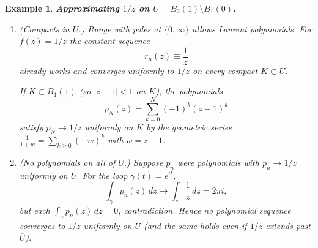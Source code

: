 \documentclass[11pt,a4paper]{article}
\newtheorem{example}{Example}
\theoremstyle{definition}
\theoremstyle{definition}
\theoremstyle{plain}
\theoremstyle{remark}
\begin{document}
\begin{example}
	\textbf{Approximating $1/z$ on $U=B_2(1)\setminus B_1(0)$.}
	\begin{enumerate}
		\item[(i)] (Compacts in $U$.) Runge with poles at $\{0,\infty\}$ allows Laurent polynomials.
		For $f(z)=1/z$ the constant sequence
		\[
		r_n(z)\equiv \frac{1}{z}
		\]
		already works and converges uniformly to $1/z$ on every compact $K\subset U$.
		
		If $K\subset B_1(1)$ (so $|z-1|<1$ on $K$), the \emph{polynomials}
		\[
		p_N(z)=\sum_{k=0}^N (-1)^k(z-1)^k
		\]
		satisfy $p_N\to 1/z$ uniformly on $K$ by the geometric series
		$\frac{1}{1+w}=\sum_{k\ge0}(-w)^k$ with $w=z-1$.
		
		\item[(ii)] (No polynomials on all of $U$.) Suppose $p_n$ were polynomials with
		$p_n\to 1/z$ uniformly on $U$. For the loop $\gamma(t)=e^{it}$,
		\[
		\int_\gamma p_n(z)\,dz \longrightarrow \int_\gamma \frac{1}{z}\,dz=2\pi i,
		\]
		but each $\int_\gamma p_n(z)\,dz=0$, contradiction. Hence no polynomial sequence
		converges to $1/z$ uniformly on $U$ (and the same holds even if $1/z$ extends past $\overline U$).
	\end{enumerate}
\end{example}
\end{document}
